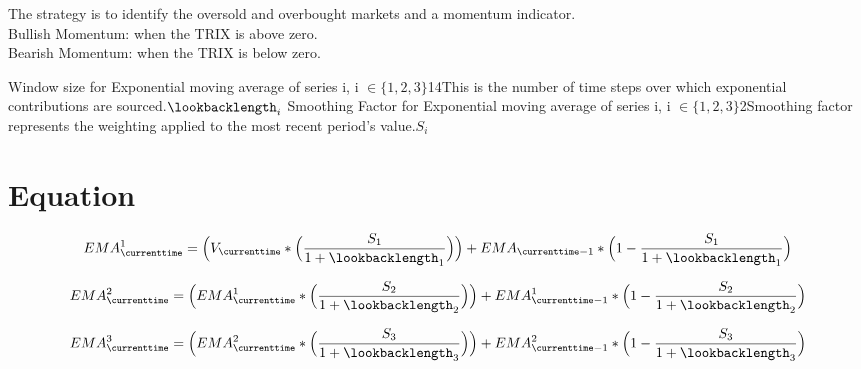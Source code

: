 \documentclass{article}
\begin{document}
\logo
{} %
\tblofcontents


\howtotrade
{The strategy is to identify the oversold and overbought markets and a momentum indicator. \\
Bullish Momentum: when the TRIX is above zero. \\
Bearish Momentum: when the TRIX is below zero.
}


{Window size for \break Exponential moving average of series i, \break i $\in \{1,2,3\}$}{14}{This is the number of time steps over which exponential contributions are sourced.}{$\lookbacklength_{i}$}
{Smoothing Factor for \break Exponential moving average of series i, \break i $\in \{1,2,3\}$}{2}{Smoothing factor represents the weighting applied to the most recent period’s value.}{$S_{i}$}
\stoptable

\newpage
\section{Equation}
\begin{equation}
    EMA_{\currenttime}^{1} = \Big(V_{\currenttime} * \Big(\frac{S_{1}}{1 + \lookbacklength_{1}}\Big)\Big) + EMA_{\currenttime-1} * \Big(1-\frac{S_{1}}{1 + \lookbacklength_{1}}\Big)
\end{equation}

\begin{equation}
    EMA_{\currenttime}^{2} = \Big(EMA_{\currenttime}^{1} * \Big(\frac{S_{2}}{1 + \lookbacklength_{2}}\Big)\Big) + EMA_{\currenttime-1}^{1} * \Big(1-\frac{S_{2}}{1 + \lookbacklength_{2}}\Big)
\end{equation}

\begin{equation}
    EMA_{\currenttime}^{3} = \Big(EMA_{\currenttime}^{2} * \Big(\frac{S_{3}}{1 + \lookbacklength_{3}}\Big)\Big) + EMA_{\currenttime-1}^{2} * \Big(1-\frac{S_{3}}{1 + \lookbacklength_{3}}\Big)
\end{equation}
\end{document}
